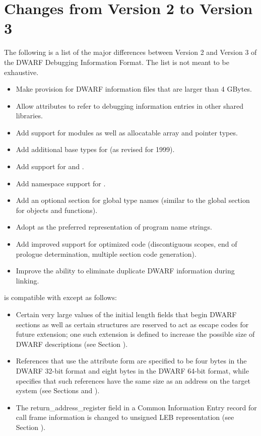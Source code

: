 \section{Changes from Version 2 to Version 3}
The following is a list of the major differences between
Version 2 and Version 3 of the DWARF Debugging Information
Format. The list is not meant to be exhaustive.
\begin{itemize}
\item
Make provision for DWARF information files that are larger
than 4 GBytes.
\item
Allow attributes to refer to debugging information entries
in other shared libraries.
\item
Add support for  modules as well as allocatable
array and pointer types.
\item
Add additional base types for  (as revised for 1999).
\item
Add support for  and .
\item
Add namespace support for .
\item
Add an optional section for global type names (similar to
the global section for objects and functions).
\item
Adopt  as the preferred representation of program name strings.
\item
Add improved support for optimized code (discontiguous
scopes, end of prologue determination, multiple section
code generation).  
\item Improve the ability to eliminate
duplicate DWARF information during linking.  
\end{itemize}

is compatible with 
 except as follows:
\begin{itemize}
\item
Certain very large values of the initial length fields that
begin DWARF sections as well as certain structures are reserved
to act as escape codes for future extension; one such extension
is defined to increase the possible size of DWARF descriptions
(see Section ).
\item
References that use the attribute form 
are specified to be four bytes in the DWARF 32-bit format and
eight bytes in the DWARF 64-bit format, while 
specifies that such references have the same size as an
address on the target system (see Sections 
 and 
).
\item
The return\_address\_register field in a Common Information
Entry record for call frame information is changed to unsigned
LEB representation (see Section 
).
\end{itemize}

